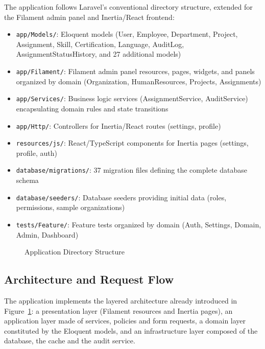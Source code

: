 \documentclass{bts-report}
\begin{document}
The application follows Laravel's conventional directory structure, extended for the Filament admin panel and Inertia/React frontend:

\begin{itemize}
  \item \texttt{app/Models/}: Eloquent models (User, Employee, Department, Project, Assignment, Skill, Certification, Language, AuditLog, AssignmentStatusHistory, and 27 additional models)
  \item \texttt{app/Filament/}: Filament admin panel resources, pages, widgets, and panels organized by domain (Organization, HumanResources, Projects, Assignments)
  \item \texttt{app/Services/}: Business logic services (AssignmentService, AuditService) encapsulating domain rules and state transitions
  \item \texttt{app/Http/}: Controllers for Inertia/React routes (settings, profile)
  \item \texttt{resources/js/}: React/TypeScript components for Inertia pages (settings, profile, auth)
  \item \texttt{database/migrations/}: 37 migration files defining the complete database schema
  \item \texttt{database/seeders/}: Database seeders providing initial data (roles, permissions, sample organizations)
  \item \texttt{tests/Feature/}: Feature tests organized by domain (Auth, Settings, Domain, Admin, Dashboard)
\end{itemize}

\begin{figure}[htbp]
  \centering
  \resizebox{\textwidth}{!}{}
  \caption{Application Directory Structure}
  \label{fig:app-structure}
\end{figure}

\subsection{Architecture and Request Flow}
The application implements the layered architecture already introduced in Figure~\ref{fig:app-structure}: a presentation layer (Filament resources and Inertia pages), an application layer made of services, policies and form requests, a domain layer constituted by the Eloquent models, and an infrastructure layer composed of the database, the cache and the audit service.
\end{document}

